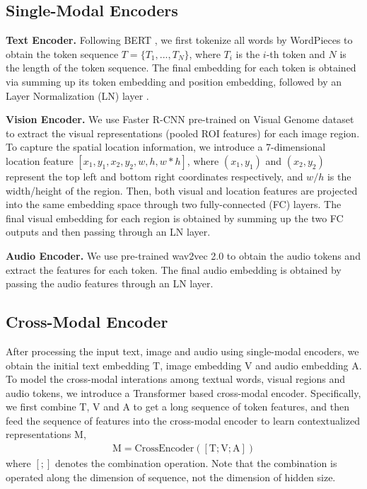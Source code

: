 \documentclass[10pt,twocolumn,letterpaper]{article}
\begin{document}
\subsection{Single-Modal Encoders}
\textbf{Text Encoder.} Following BERT \cite{bert}, we first tokenize all words by WordPieces \cite{johnson2017google} to obtain the token sequence $T = \{T_1,...,T_N\}$, where $T_i$ is the $i$-th token and $N$ is the length of the token sequence. The final embedding for each token is obtained via summing up its token embedding and position embedding, followed by an Layer Normalization (LN) layer \cite{ba2016layer}. 

\textbf{Vision Encoder.} We use Faster R-CNN \cite{ren2015faster} pre-trained on Visual Genome dataset \cite{krishna2017visual} to extract the visual representations (pooled ROI features) for each image region. To capture the spatial location information, we introduce a 7-dimensional location feature $[x_1, y_1, x_2, y_2, w, h, w*h]$, where $(x_1, y_1)$ and $(x_2, y_2)$ represent the top left and bottom right coordinates respectively, and $w/h$ is the width/height of the region. Then, both visual and location features are projected into the same embedding space through two fully-connected (FC) layers. The final visual embedding for each region is obtained by summing up the two FC outputs and then passing through an LN layer. 

\textbf{Audio Encoder.} We use pre-trained wav2vec 2.0 \cite{wav2vec} to obtain the audio tokens and extract the features for each token. The final audio embedding is obtained by passing the audio features through an LN layer.

\subsection{Cross-Modal Encoder}
After processing the input text, image and audio using single-modal encoders, we obtain the initial text embedding $\boldsymbol{\mathrm{T}}$, image embedding $\boldsymbol{\mathrm{V}}$ and audio embedding $\boldsymbol{\mathrm{A}}$. To model the cross-modal interations among textual words, visual regions and audio tokens, we introduce a Transformer based cross-modal encoder. Specifically, we first combine $\boldsymbol{\mathrm{T}}$, $\boldsymbol{\mathrm{V}}$ and $\boldsymbol{\mathrm{A}}$ to get a long sequence of token features, and then feed the sequence of features into the cross-modal encoder to learn contextualized representations $\boldsymbol{\mathrm{M}}$,
\begin{align}
\boldsymbol{\mathrm{M}} = \mathrm{CrossEncoder}([\boldsymbol{\mathrm{T}}; \boldsymbol{\mathrm{V}}; \boldsymbol{\mathrm{A}}])
\end{align} 
where $[;]$ denotes the combination operation. Note that the combination is operated along the dimension of sequence, not the dimension of hidden size.
\end{document}
